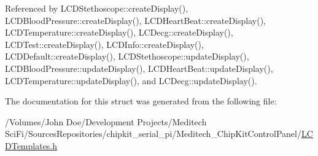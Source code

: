 Referenced by L\-C\-D\-Stethoscope\-::create\-Display(), L\-C\-D\-Blood\-Pressure\-::create\-Display(), L\-C\-D\-Heart\-Beat\-::create\-Display(), L\-C\-D\-Temperature\-::create\-Display(), L\-C\-Decg\-::create\-Display(), L\-C\-D\-Test\-::create\-Display(), L\-C\-D\-Info\-::create\-Display(), L\-C\-D\-Default\-::create\-Display(), L\-C\-D\-Stethoscope\-::update\-Display(), L\-C\-D\-Blood\-Pressure\-::update\-Display(), L\-C\-D\-Heart\-Beat\-::update\-Display(), L\-C\-D\-Temperature\-::update\-Display(), and L\-C\-Decg\-::update\-Display().



The documentation for this struct was generated from the following file\-:\begin{DoxyCompactItemize}
\item 
/\-Volumes/\-John Doe/\-Development Projects/\-Meditech Sci\-Fi/\-Sources\-Repositories/chipkit\-\_\-serial\-\_\-pi/\-Meditech\-\_\-\-Chip\-Kit\-Control\-Panel/\hyperlink{_l_c_d_templates_8h}{L\-C\-D\-Templates.\-h}\end{DoxyCompactItemize}

